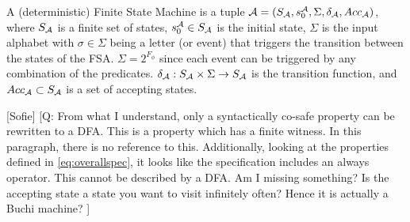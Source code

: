 \documentclass[conference]{IEEEtran}
\newcommand{\sofie}[1]{{\color{purple} [Sofie] #1}}
\begin{document}

\begin{definition}
A (deterministic) Finite State Machine is a tuple $\mathcal{A} = (S_{\mathcal{A}}, s_0^{\mathcal{A}}, \Sigma, \delta_{\mathcal{A}}, Acc_{\mathcal{A}})$, where %
$S_{\mathcal{A}}$ is a finite set of states, $s_0^{\mathcal{A}} \in S_{\mathcal{A}}$ is the initial state,
$\Sigma$ is the input alphabet with $\sigma\in\Sigma$ being a letter (or event) that triggers the transition between the states of the FSA. $\Sigma = 2^{F_\phi}$ since each event can be triggered by any combination of the predicates.
$\delta_{\mathcal{A}} : S_{\mathcal{A}} \times \Sigma \rightarrow S_{\mathcal{A}}$ is the transition function, and
$Acc_{\mathcal{A}}\subset S_{\mathcal{A}}$ is a set of accepting states.
\end{definition}
\sofie{[Q: From what I understand, only a syntactically co-safe property can be rewritten to a DFA. This is a property which has a finite witness. In this paragraph, there is no reference to this. Additionally, looking at the properties defined in \eqref{eq:overallspec}, it looks like the specification includes an always operator. This cannot be described by a DFA. Am I missing something? Is the accepting state a state you want to visit infinitely often? Hence it is actually a Buchi machine? ]}

\newcommand{\goal}{{\color{green!50!black}\blacksquare}}
\newcommand{\obst}{{\color{red}\blacksquare}}
\end{document}
